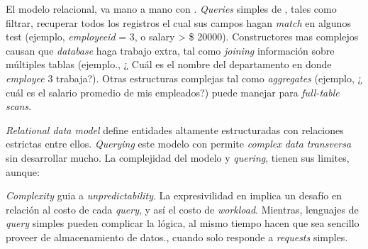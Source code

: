 El modelo relacional, va mano a mano con . \textit{Queries} simples de , tales como filtrar, recuperar todos los registros el cual sus campos hagan \textit{match} en algunos test (ejemplo, \textit{employeeid} = 3, o salary > \$ 20000). Constructores mas complejos causan que \textit{database} haga trabajo extra, tal como \textit{joining} información sobre múltiples tablas (ejemplo., ¿ Cuál es el nombre del departamento en donde \textit{employee} 3 trabaja?). Otras estructuras complejas tal como \textit{aggregates} (ejemplo, ¿ cuál es el salario promedio de mis empleados?) puede manejar para \textit{full-table scans}.


\textit{Relational data model} define entidades altamente estructuradas con relaciones estrictas entre ellos. \textit{Querying} este modelo con  permite \textit{complex data transversa} sin desarrollar mucho. La complejidad del modelo y \textit{quering}, tienen sus limites, aunque:

\textit{Complexity} guia a \textit{unpredictability}. La expresivilidad en  implica un desafío en relación al costo de cada \textit{query}, y así el costo de \textit{workload}. Mientras, lenguajes de \textit{query} simples pueden complicar la lógica, al mismo tiempo hacen que sea sencillo proveer de almacenamiento de datos., cuando solo responde a \textit{requests} simples.

